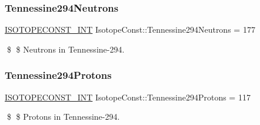 \subsubsection{\texorpdfstring{Tennessine294\+Neutrons}{Tennessine294Neutrons}}
{\footnotesize\ttfamily \mbox{\hyperlink{group___isotope_const-_macros_ga5f18360b3e99483a35c32d789e62621c}{I\+S\+O\+T\+O\+P\+E\+C\+O\+N\+S\+T\+\_\+\+I\+NT}} Isotope\+Const\+::\+Tennessine294\+Neutrons = 177}

\$ \$ Neutrons in Tennessine-\/294. \mbox{\label{group___isotope_const-_tennessine-_ts294_gaef999f48a4fbbfd776f5c1e5f87cecf2}} 
\subsubsection{\texorpdfstring{Tennessine294\+Protons}{Tennessine294Protons}}
{\footnotesize\ttfamily \mbox{\hyperlink{group___isotope_const-_macros_ga5f18360b3e99483a35c32d789e62621c}{I\+S\+O\+T\+O\+P\+E\+C\+O\+N\+S\+T\+\_\+\+I\+NT}} Isotope\+Const\+::\+Tennessine294\+Protons = 117}

\$ \$ Protons in Tennessine-\/294. 